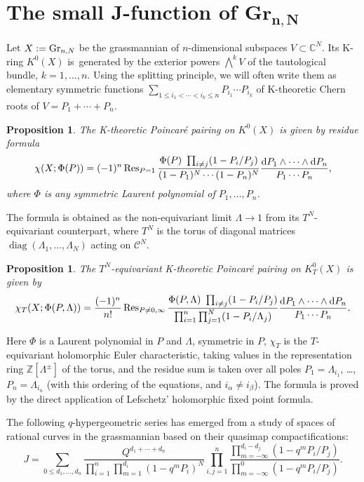\documentclass[10pt,a4paper]{amsart}
\numberwithin{equation}{section}
\newtheorem{Proposition}[Theorem]{Proposition}
{ \theoremstyle{definition}
\newtheorem{Definition}[Theorem]{Definition}
\newtheorem{Example}[Theorem]{Example}
\newtheorem{Remark}[Theorem]{Remark} }
\def\C{\mathcal C}
\def\ZZ{\mathbb Z}
\def\CC{\mathbb C}
\def\Res{\operatorname{Res}}
\def\a{\alpha}
\def\b{\beta}
\theoremstyle{definition}
\theoremstyle{plain}
\begin{document}
\section[The small J-function of Gr {n,N}]{The small J-function of $\mathbf{Gr}_{\boldsymbol{n,N}}$}
\label{Sec2}

{\sloppy
Let $X:={\rm Gr}_{n,N}$ be the grassmannian of $n$-dimensional subspaces $V\subset \CC^N$. Its K-ring $K^0(X)$ is~generated by the exterior powers $\bigwedge^kV$ of the tautological bundle, $k=1,\dots,n$. Using the \mbox{splitting} principle, we will often write them as elementary symmetric functions $\sum_{1\leq i_1<\cdots<i_k\leq n}P_{i_1}\cdots P_{i_k}$ of K-theoretic Chern roots of $V=P_1+\cdots+P_n$.

}

\begin{Proposition} \label{prop1}
The K-theoretic Poincar{\'e} pairing on $K^0(X)$ is given by residue formula
\[
\chi(X; \Phi(P))= (-1)^n\Res_{P=1} \frac{\Phi(P) \ \prod_{i\neq j}(1-P_i/P_j)}{(1-P_1)^N\cdots(1-P_n)^N} \frac{{\rm d}P_1\wedge\cdots \wedge {\rm d}P_n}{P_1\cdots P_n},
\]
where $\Phi$ is any symmetric Laurent polynomial of $P_1,\dots,P_n$.
\end{Proposition}

The formula is obtained as the non-equivariant limit $\Lambda\to 1$ from its $T^N$-equivariant counterpart, where $T^N$ is the torus of diagonal matrices $\operatorname{diag}(\Lambda_1,\dots,\Lambda_N)$ acting on $\C^N$.

\begin{Proposition}\label{prop2}
The $T^N$-equivariant K-theoretic Poincar{\'e} pairing on $K^0_T(X)$ is given by
\[
\chi_T(X;\Phi(P,\Lambda))= \frac{(-1)^n}{n!} \Res_{P\neq 0,\infty} \frac{\Phi(P,\Lambda)\ \prod_{i\neq j}(1-P_i/P_j)}{\prod_{i=1}^n\prod_{j=1}^N(1-P_i/\Lambda_j)} \frac{{\rm d}P_1\wedge\cdots \wedge {\rm d}P_n}{P_1\cdots P_n}.
\]
\end{Proposition}
Here $\Phi$ is a Laurent polynomial in $P$ and $\Lambda$, symmetric in $P$, $\chi_T$ is the $T$-equivariant holomorphic Euler characteristic, taking values in the representation ring $\ZZ[\Lambda^{\pm}]$ of the torus, and the residue sum is taken over all poles $P_1=\Lambda_{i_1}$, \dots, $P_n=\Lambda_{i_n}$ (with this ordering of the equations, and $i_\a\neq i_\b$). The formula is proved by the direct application of Lefschetz' holomorphic fixed point formula.

The following $q$-hypergeometric series has emerged from a study of spaces of rational curves in the grassmannian based on their quasimap compactifications:
\[
J=\sum_{0\leq d_1,\dots,d_n}\frac{Q^{d_1+\cdots+ d_n}}{\prod_{i=1}^n\prod_{m=1}^{d_i}(1-q^mP_i)^N} \prod_{i,j=1}^n\frac{\prod_{m=-\infty}^{d_i-d_j}(1-q^mP_i/P_j)} {\prod_{m=-\infty}^0(1-q^mP_i/P_j)}.
\]
\end{document}

